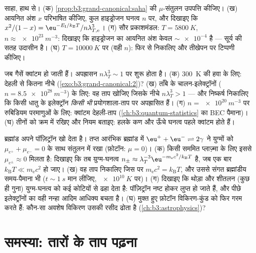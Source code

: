\begin{exercise}[$\star\star\star$]\label{exo:b3:grand-canonical:10}
साहा, हाथ से। (क) \cref{prop:b3:grand-canonical:saha} की
$\mu$-संतुलन उपपत्ति कीजिए। (ख) आयनित अंश $x$ परिभाषित कीजिए, कुल
हाइड्रोजन घनत्व $n$ पर, और दिखाइए कि $x^2/(1 - x)
= \eu^{-E_{\text{I}}/k_{\text{B}}T}/n\lambda_{T,\text{e}}^3$। (ग)
सौर प्रकाशमंडल: $T = \qty{5800}{K}$, $n \approx
\qty{e23}{m^{-3}}$: दिखाइए कि हाइड्रोजन का आयनित अंश केवल
$\sim\num{e-4}$ है --- सूर्य की सतह उदासीन है। (घ) $T =
\qty{10000}{K}$ पर (वही $n$): फिर से निकालिए और तीखेपन पर टिप्पणी
कीजिए।
\end{exercise}

\begin{exercise}[$\star\star\star$]\label{exo:b3:grand-canonical:11}
जब गैसें क्वांटम हो जाती हैं। अपह्रासन $n\lambda_T^3 \sim
1$ पर शुरू होता है। (क) \qty{300}{K} की हवा के लिए: देहली से कितना
नीचे (\cref{exo:b3:grand-canonical:2})? (ख) ताँबे के चालन-इलेक्ट्रॉनों
($n = \qty{8.5e28}{m^{-3}}$) के लिए: वह ताप खोजिए जिसके नीचे
$n\lambda_T^3 > 1$ --- और निष्कर्ष निकालिए कि किसी धातु के
इलेक्ट्रॉन \emph{किसी भी} प्रयोगशाला-ताप पर अपह्रासित हैं।
(ग) $n = \qty{e20}{m^{-3}}$ पर रुबिडियम परमाणुओं के लिए: क्वांटम
देहली-ताप (\cref{ch:b3:quantum-statistics} का BEC पैमाना)। (घ)
तीनों को क्रम में रखिए और नियम बताइए: हलके कण और ऊँचे घनत्व पहले
क्वांटम होते हैं।
\end{exercise}

\begin{exercise}[$\star\star\star$]\label{exo:b3:grand-canonical:12}
ब्रह्मांड अपने पॉज़िट्रॉन खो देता है। तप्त आरंभिक ब्रह्मांड में
$\eu^+ + \eu^- \rightleftharpoons 2\gamma$ ने युग्मों को
$\mu_{e^+} + \mu_{e^-} = 0$ के साथ संतुलन में रखा (फ़ोटॉन: $\mu = 0$)।
(क) किसी सममित प्लाज़्मा के लिए इससे $\mu_{e^\pm} \approx 0$ मिलता है:
दिखाइए कि तब युग्म-घनत्व $n_\pm \approx
\lambda_T^{-3}\eu^{-m_{\text{e}}c^2/k_{\text{B}}T}$ है, जब एक बार
$k_{\text{B}}T \ll m_{\text{e}}c^2$ हो जाए। (ख) वह ताप निकालिए
जिस पर $m_{\text{e}}c^2 = k_{\text{B}}T$, और उससे संगत ब्रह्मांडीय
समय-पैमाना भी ($t \sim \qty{1}{s}$ मान लीजिए,
$\qty{e10}{K}$ पर)। (ग) दिखाइए कि थोड़ा और शीतलन (कुछ ही गुना)
युग्म-घनत्व को कई कोटियों से ढहा देता है:
पॉज़िट्रॉन नष्ट होकर लुप्त हो जाते हैं, और पीछे इलेक्ट्रॉनों का वही
नन्हा आदिम आधिक्य बचता है। (घ) मुक्त हुए फ़ोटॉन
विकिरण-कुंड को फिर गरम करते हैं: कौन-सा अवशेष विकिरण उसकी रसीद ढोता
है (\cref{ch:b3:astrophysics})?
\end{exercise}

\section{समस्या: तारों के ताप पढ़ना}

